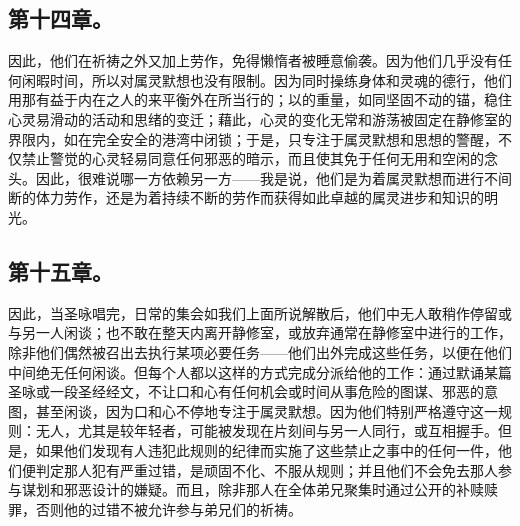 
\subsection{第十四章。}

\par

因此，他们在祈祷之外又加上劳作，免得懒惰者被睡意偷袭。因为他们几乎没有任何闲暇时间，所以对属灵默想也没有限制。因为同时操练身体和灵魂的德行，他们用那有益于内在之人的来平衡外在所当行的；以的重量，如同坚固不动的锚，稳住心灵易滑动的活动和思绪的变迁；藉此，心灵的变化无常和游荡被固定在静修室的界限内，如在完全安全的港湾中闭锁；于是，只专注于属灵默想和思想的警醒，不仅禁止警觉的心灵轻易同意任何邪恶的暗示，而且使其免于任何无用和空闲的念头。因此，很难说哪一方依赖另一方——我是说，他们是为着属灵默想而进行不间断的体力劳作，还是为着持续不断的劳作而获得如此卓越的属灵进步和知识的明光。\par


\subsection{第十五章。}

\par

因此，当圣咏唱完，日常的集会如我们上面所说解散后，他们中无人敢稍作停留或与另一人闲谈；也不敢在整天内离开静修室，或放弃通常在静修室中进行的工作，除非他们偶然被召出去执行某项必要任务——他们出外完成这些任务，以便在他们中间绝无任何闲谈。但每个人都以这样的方式完成分派给他的工作：通过默诵某篇圣咏或一段圣经经文，不让口和心有任何机会或时间从事危险的图谋、邪恶的意图，甚至闲谈，因为口和心不停地专注于属灵默想。因为他们特别严格遵守这一规则：无人，尤其是较年轻者，可能被发现在片刻间与另一人同行，或互相握手。但是，如果他们发现有人违犯此规则的纪律而实施了这些禁止之事中的任何一件，他们便判定那人犯有严重过错，是顽固不化、不服从规则；并且他们不会免去那人参与谋划和邪恶设计的嫌疑。而且，除非那人在全体弟兄聚集时通过公开的补赎赎罪，否则他的过错不被允许参与弟兄们的祈祷。\par


